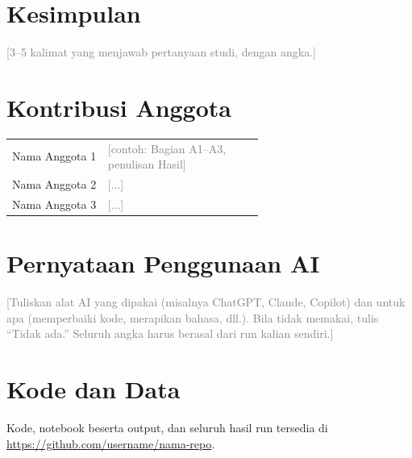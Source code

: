\documentclass[conference,a4paper]{IEEEtran}
\newcommand{\petunjuk}[1]{\textcolor{gray}{[#1]}}
\begin{document}
\section{Kesimpulan}
\petunjuk{3--5 kalimat yang menjawab pertanyaan studi, dengan angka.}

\section*{Kontribusi Anggota}
\begin{tabular}{@{}lp{0.62\linewidth}@{}}
  Nama Anggota 1 & \petunjuk{contoh: Bagian A1--A3, penulisan Hasil} \\
  Nama Anggota 2 & \petunjuk{...} \\
  Nama Anggota 3 & \petunjuk{...} \\
\end{tabular}

\section*{Pernyataan Penggunaan AI}
\petunjuk{Tuliskan alat AI yang dipakai (misalnya ChatGPT, Claude, Copilot) dan untuk apa (memperbaiki kode, merapikan bahasa, dll.). Bila tidak memakai, tulis ``Tidak ada.'' Seluruh angka harus berasal dari run kalian sendiri.}

\section*{Kode dan Data}
Kode, notebook beserta output, dan seluruh hasil run tersedia di \url{https://github.com/username/nama-repo}.



\end{document}

